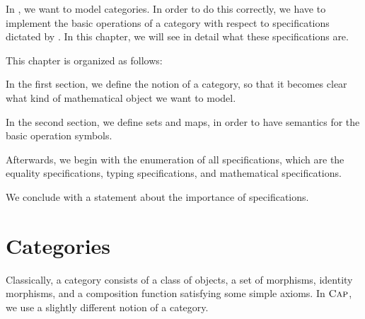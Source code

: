 In \CapPkg, we want to model categories.
In order to do this correctly, we have to implement the basic operations
of a category with respect to specifications dictated by \CapPkg.
In this chapter, we will see in detail what these specifications are.

This chapter is organized as follows:

In the first section, we define the notion of a category, so that it becomes
clear what kind of mathematical object we want to model.

In the second section, we define \GAP sets and \GAP maps, in order to have semantics
for the basic operation symbols.

Afterwards, we begin with the enumeration of all specifications, which are
the equality specifications, typing specifications, and mathematical specifications.

We conclude with a statement about the importance of specifications.

\section{Categories}\label{section:categories}

Classically, a category consists of a class of objects, a set of morphisms, identity morphisms, and a composition function
satisfying some simple axioms. In $\textsc{Cap}$, we use a slightly different notion of a category.

